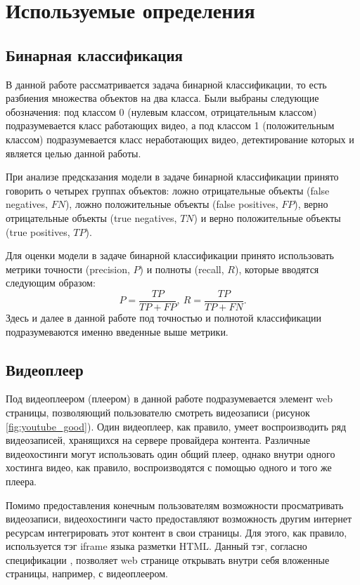 \chapter{Используемые определения}

\section{Бинарная классификация}

В данной работе рассматривается задача бинарной классификации, то есть разбиения множества объектов на два класса. Были выбраны следующие обозначения: под классом 0 (нулевым классом, отрицательным классом) подразумевается класс работающих видео, а под классом 1 (положительным классом) подразумевается класс неработающих видео, детектирование которых и является целью данной работы.

При анализе предсказания модели в задаче бинарной классификации принято говорить о четырех группах объектов: ложно отрицательные объекты (false negatives, $FN$), ложно положительные объекты (false positives, $FP$), верно отрицательные объекты (true negatives, $TN$) и верно положительные объекты (true positives, $TP$).

Для оценки модели в задаче бинарной классификации принято использовать метрики точности (precision, $P$) и полноты (recall, $R$), которые вводятся следующим образом:
\[
    P = \frac{TP}{TP + FP},\ R = \frac{TP}{TP + FN}.
\]
Здесь и далее в данной работе под точностью и полнотой классификации подразумеваются именно введенные выше метрики.

\section{Видеоплеер}

Под видеоплеером (плеером) в данной работе подразумевается элемент web страницы, позволяющий пользователю смотреть видеозаписи (рисунок \ref{fig:youtube_good}). Один видеоплеер, как правило, умеет воспроизводить ряд видеозаписей, хранящихся на сервере провайдера контента. Различные видеохостинги могут использовать один общий плеер, однако внутри одного хостинга видео, как правило, воспроизводятся с помощью одного и того же плеера.

Помимо предоставления конечным пользователям возможности просматривать видеозаписи, видеохостинги часто предоставляют возможность другим интернет ресурсам интегрировать этот контент в свои страницы. Для этого, как правило, используется тэг iframe языка разметки HTML. Данный тэг, согласно спецификации \cite{HTML53}, позволяет web странице открывать внутри себя вложенные страницы, например, с видеоплеером.

